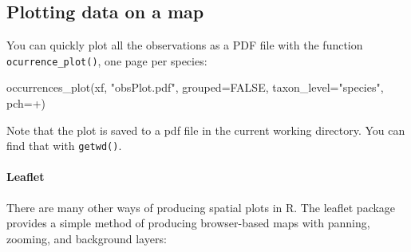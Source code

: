 \documentclass[
  10pt,
]{article}
\newenvironment{Shaded}{\begin{snugshade}}{\end{snugshade}}
\newcommand{\AttributeTok}[1]{\textcolor[rgb]{0.77,0.63,0.00}{#1}}
\newcommand{\ConstantTok}[1]{\textcolor[rgb]{0.00,0.00,0.00}{#1}}
\newcommand{\FunctionTok}[1]{\textcolor[rgb]{0.00,0.00,0.00}{#1}}
\newcommand{\NormalTok}[1]{#1}
\newcommand{\StringTok}[1]{\textcolor[rgb]{0.31,0.60,0.02}{#1}}
\begin{document}
\hypertarget{plotting-data-on-a-map}{%
\subsection{Plotting data on a map}\label{plotting-data-on-a-map}}

You can quickly plot all the observations as a PDF file with the function \texttt{ocurrence\_plot()}, one page per species:

\begin{Shaded}
\begin{Highlighting}[]
\FunctionTok{occurrences\_plot}\NormalTok{(xf, }\StringTok{"obsPlot.pdf"}\NormalTok{, }
                 \AttributeTok{grouped=}\ConstantTok{FALSE}\NormalTok{, }
                 \AttributeTok{taxon\_level=}\StringTok{"species"}\NormalTok{, }
                 \AttributeTok{pch=}\StringTok{\textquotesingle{}+\textquotesingle{}}\NormalTok{)}
\end{Highlighting}
\end{Shaded}

Note that the plot is saved to a pdf file in the current working directory. You can find that with \texttt{getwd()}.

\hypertarget{leaflet}{%
\paragraph{Leaflet}\label{leaflet}}

There are many other ways of producing spatial plots in R. The leaflet package provides a simple method of producing browser-based maps with panning, zooming, and background layers:
\end{document}
